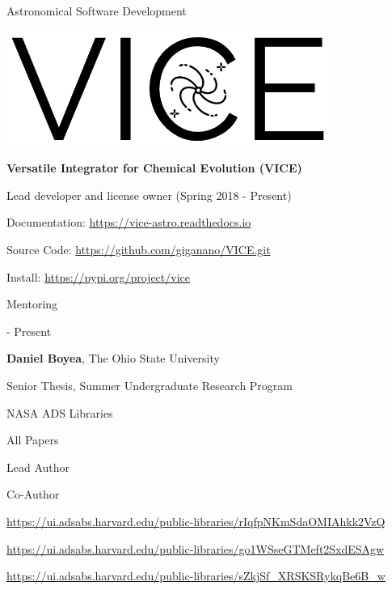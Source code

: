 \documentclass[cv.tex]{subfiles}
\begin{document}
\vspace{5mm}
\noindent
{%
{\color{themecolor}\large Astronomical Software Development}
\par\noindent
\parbox{0.35\textwidth}{%
	\centering
	\includegraphics[scale = 0.33]{vice-logo.png}
}
\parbox{0.63\textwidth}{%
	\textbf{Versatile Integrator for Chemical Evolution (VICE)} \par
	Lead developer and license owner (Spring 2018 - Present) \par
	Documentation: \url{https://vice-astro.readthedocs.io} \par
	Source Code: \url{https://github.com/giganano/VICE.git} \par
	Install: \url{https://pypi.org/project/vice}
}
}

\vspace{5mm}
\noindent
{\color{themecolor} \large Mentoring}
\par\noindent
\parbox{0.18\textwidth}{%
	 - Present \par
	\null
}
\hspace{1mm}
\parbox{0.8\textwidth}{%
	\vspace{1mm}
	\textbf{Daniel Boyea}, The Ohio State University \par
	Senior Thesis, Summer Undergraduate Research Program
}

\vspace{5mm}
\noindent
{\color{themecolor} \large NASA ADS Libraries}
\par\noindent
\parbox{0.18\textwidth}{%
	\small\raggedleft
	All Papers \par
	Lead Author \par
	Co-Author \par
}
\hspace{1mm}
\parbox{0.8\textwidth}{%
	\small\vspace{1mm}
	\url{https://ui.adsabs.harvard.edu/public-libraries/rIqfpNKmSdaOMIAhkk2VzQ}
	\par
	\url{https://ui.adsabs.harvard.edu/public-libraries/go1WSseGTMeft2SxdESAgw}
	\par
	\url{https://ui.adsabs.harvard.edu/public-libraries/sZkjSf_XRSKSRykqBe6B_w}
}
\end{document}
